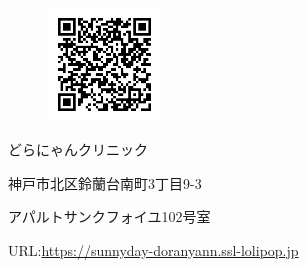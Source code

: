 \documentclass{jsarticle}
\begin{document}
	\vspace{30pt}
	\begin{figure}
		\vspace*{-\intextsep}
		\includegraphics[width=3cm]{URLdoranyan.png}
	\end{figure}
	どらにゃんクリニック

	神戸市北区鈴蘭台南町3丁目9-3

	アパルトサンクフォイユ102号室

	URL:\url{https://sunnyday-doranyann.ssl-lolipop.jp}
\end{document}
